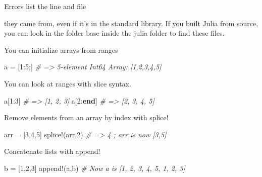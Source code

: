 \documentclass[ignorenonframetext,]{beamer}
\newenvironment{Shaded}{}{}
\newcommand{\KeywordTok}[1]{\textcolor[rgb]{0.00,0.44,0.13}{\textbf{{#1}}}}
\newcommand{\FloatTok}[1]{\textcolor[rgb]{0.25,0.63,0.44}{{#1}}}
\newcommand{\CommentTok}[1]{\textcolor[rgb]{0.38,0.63,0.69}{\textit{{#1}}}}
\newcommand{\NormalTok}[1]{{#1}}
\begin{document}
\begin{frame}{Errors list the line and file}

they came from, even if it's in the standard library. If you built Julia
from source, you can look in the folder base inside the julia folder to
find these files.

\end{frame}

\begin{frame}[fragile]{You can initialize arrays from ranges}

\begin{Shaded}
\begin{Highlighting}[]
\NormalTok{a = [}\FloatTok{1}\NormalTok{:}\FloatTok{5}\NormalTok{;] }\CommentTok{# => 5-element Int64 Array: [1,2,3,4,5]}
\end{Highlighting}
\end{Shaded}

\end{frame}

\begin{frame}[fragile]{You can look at ranges with slice syntax.}

\begin{Shaded}
\begin{Highlighting}[]
\NormalTok{a[}\FloatTok{1}\NormalTok{:}\FloatTok{3}\NormalTok{] }\CommentTok{# => [1, 2, 3]}
\NormalTok{a[}\FloatTok{2}\NormalTok{:}\KeywordTok{end}\NormalTok{] }\CommentTok{# => [2, 3, 4, 5]}
\end{Highlighting}
\end{Shaded}

\end{frame}

\begin{frame}[fragile]{Remove elements from an array by index with
splice!}

\begin{Shaded}
\begin{Highlighting}[]
\NormalTok{arr = [}\FloatTok{3}\NormalTok{,}\FloatTok{4}\NormalTok{,}\FloatTok{5}\NormalTok{]}
\NormalTok{splice!(arr,}\FloatTok{2}\NormalTok{) }\CommentTok{# => 4 ; arr is now [3,5]}
\end{Highlighting}
\end{Shaded}

\end{frame}

\begin{frame}[fragile]{Concatenate lists with append!}

\begin{Shaded}
\begin{Highlighting}[]
\NormalTok{b = [}\FloatTok{1}\NormalTok{,}\FloatTok{2}\NormalTok{,}\FloatTok{3}\NormalTok{]}
\NormalTok{append!(a,b) }\CommentTok{# Now a is [1, 2, 3, 4, 5, 1, 2, 3]}
\end{Highlighting}
\end{Shaded}

\end{frame}
\end{document}

